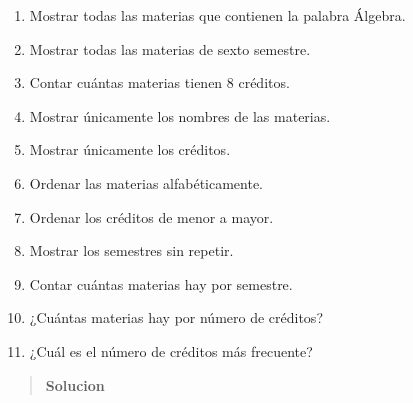 \documentclass[
  spanish,
  12pt,
  letterpaper,
  DIV=11,
  numbers=noendperiod]{scrreprt}
\begin{document}
\begin{tcolorbox}
\begin{enumerate}
  \textbf{Columna 1:} materias, \textbf{Columna 2:} créditos,
  \textbf{Columna 3:} semestre.
\item
  Mostrar todas las materias que contienen la palabra Álgebra.
\item
  Mostrar todas las materias de sexto semestre.
\item
  Contar cuántas materias tienen 8 créditos.
\item
  Mostrar únicamente los nombres de las materias.
\item
  Mostrar únicamente los créditos.
\item
  Ordenar las materias alfabéticamente.
\item
  Ordenar los créditos de menor a mayor.
\item
  Mostrar los semestres sin repetir.
\item
  Contar cuántas materias hay por semestre.
\item
  ¿Cuántas materias hay por número de créditos?
\item
  ¿Cuál es el número de créditos más frecuente?
\end{enumerate}

\begin{quote}
\textbf{Solucion}


\end{quote}
\end{tcolorbox}
\end{document}

